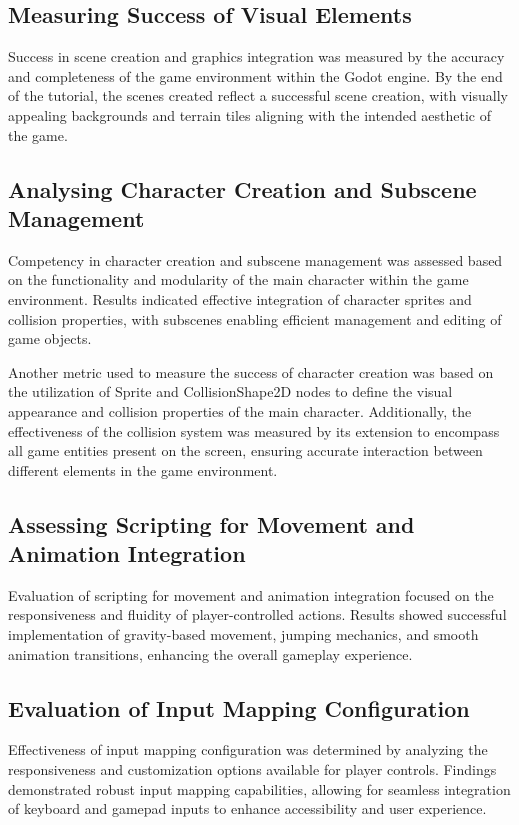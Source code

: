 \documentclass[10pt,twocolumn]{article}
\begin{document}
\subsection{Measuring Success of Visual Elements}
Success in scene creation and graphics integration was measured by the accuracy and completeness of the game environment within the Godot engine. By the end of the tutorial, the scenes created reflect a  successful scene creation, with visually appealing backgrounds and terrain tiles aligning with the intended aesthetic of the game.

\subsection{Analysing Character Creation and Subscene Management}
Competency in character creation and subscene management was assessed based on the functionality and modularity of the main character within the game environment. Results indicated effective integration of character sprites and collision properties, with subscenes enabling efficient management and editing of game objects.

Another metric used to measure the success of character creation was based on the utilization of Sprite and CollisionShape2D nodes to define the visual appearance and collision properties of the main character. Additionally, the effectiveness of the collision system was measured by its extension to encompass all game entities present on the screen, ensuring accurate interaction between different elements in the game environment. 

\subsection{Assessing Scripting for Movement and Animation Integration}
Evaluation of scripting for movement and animation integration focused on the responsiveness and fluidity of player-controlled actions. Results showed successful implementation of gravity-based movement, jumping mechanics, and smooth animation transitions, enhancing the overall gameplay experience.

\subsection{Evaluation of Input Mapping Configuration}
Effectiveness of input mapping configuration was determined by analyzing the responsiveness and customization options available for player controls. Findings demonstrated robust input mapping capabilities, allowing for seamless integration of keyboard and gamepad inputs to enhance accessibility and user experience.
\end{document}
